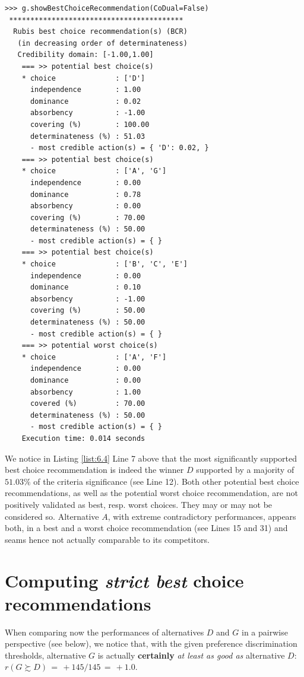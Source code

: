 \begin{lstlisting}[caption={Computing a best choice recommendation},label=list:6.4]
>>> g.showBestChoiceRecommendation(CoDual=False)
 *****************************************
  Rubis best choice recommendation(s) (BCR)
   (in decreasing order of determinateness)   
   Credibility domain: [-1.00,1.00]
    === >> potential best choice(s)
    * choice              : ['D']
      independence        : 1.00
      dominance           : 0.02
      absorbency          : -1.00
      covering (%)        : 100.00
      determinateness (%) : 51.03
      - most credible action(s) = { 'D': 0.02, }
    === >> potential best choice(s)
    * choice              : ['A', 'G']
      independence        : 0.00
      dominance           : 0.78
      absorbency          : 0.00
      covering (%)        : 70.00
      determinateness (%) : 50.00
      - most credible action(s) = { }
    === >> potential best choice(s)
    * choice              : ['B', 'C', 'E']
      independence        : 0.00
      dominance           : 0.10
      absorbency          : -1.00
      covering (%)        : 50.00
      determinateness (%) : 50.00
      - most credible action(s) = { }
    === >> potential worst choice(s) 
    * choice              : ['A', 'F']
      independence        : 0.00
      dominance           : 0.00
      absorbency          : 1.00
      covered (%)         : 70.00
      determinateness (%) : 50.00
      - most credible action(s) = { }
    Execution time: 0.014 seconds
\end{lstlisting}

We notice in Listing \ref{list:6.4} Line 7 above that the most significantly supported best choice recommendation is indeed the \Condorcet winner $D$ supported by a majority of $51.03\%$ of the criteria significance (see Line 12). Both other potential best choice recommendations, as well as the potential worst choice recommendation, are not positively validated as best, resp. worst choices. They may or may not be considered so. Alternative $A$, with extreme contradictory performances, appears both, in a best and a worst choice recommendation (see Lines 15 and 31) and seams hence not actually comparable to its competitors.

\section{Computing \emph{strict best} choice recommendations}
\label{sec:6.4}

When comparing now the performances of alternatives $D$ and $G$ in a pairwise perspective (see below), we notice that, with the given preference discrimination thresholds, alternative $G$ is actually \textbf{certainly} \emph{at least as good as} alternative $D$:  $r(G \succsim D)\, = \, +145/145\, =\, +1.0$.


